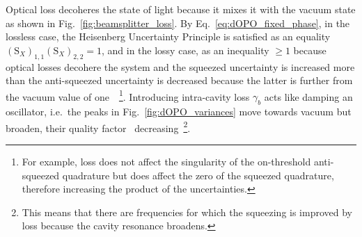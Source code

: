Optical loss decoheres the state of light because it mixes it with the vacuum state as shown in Fig.~\ref{fig:beamsplitter_loss}.
By Eq.~\ref{eq:dOPO_fixed_phase}, in the lossless case, the Heisenberg Uncertainty Principle is satisfied as an equality $(\text{S}_X)_{1,1}(\text{S}_X)_{2,2}=1$, and in the lossy case, as an inequality $\geq1$ because optical losses decohere the system and the squeezed uncertainty is increased more than the anti-squeezed uncertainty is decreased because the latter is further from the vacuum value of one~\cite{}~\footnote{For example, loss does not affect the singularity of the on-threshold anti-squeezed quadrature but does affect the zero of the squeezed quadrature, therefore increasing the product of the uncertainties.}.
Introducing intra-cavity loss $\gamma_b$ acts like damping an oscillator, i.e.\ the peaks in Fig.~\ref{fig:dOPO_variances} move towards vacuum but broaden, their quality factor~\cite{} decreasing~\footnote{This means that there are frequencies for which the squeezing is improved by loss because the cavity resonance broadens.}.
